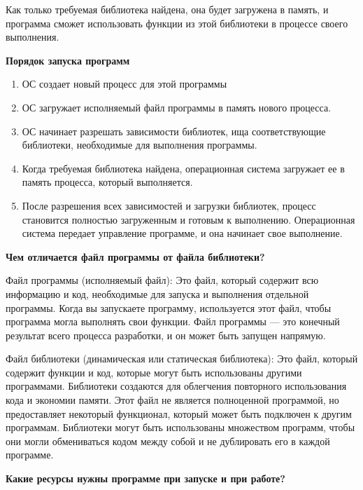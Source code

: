 \documentclass[oneside, final, 14pt]{extreport} %
\begin{document}
Как только требуемая библиотека найдена, она будет загружена в память, и программа сможет использовать функции из этой библиотеки в процессе своего выполнения.

\vspace*{\baselineskip}

\textbf{Порядок запуска программ}

\begin{enumerate}
    \item ОС создает новый процесс для этой программы
    \item ОС загружает исполняемый файл программы в память нового процесса.
    \item ОС начинает разрешать зависимости библиотек, ища соответствующие библиотеки, необходимые для выполнения программы.
    \item Когда требуемая библиотека найдена, операционная система загружает ее в память процесса, который выполняется.
    \item После разрешения всех зависимостей и загрузки библиотек, процесс становится полностью загруженным и готовым к выполнению. Операционная система передает управление программе, и она начинает свое выполнение.
\end{enumerate}


\vspace*{\baselineskip}

\textbf{Чем отличается файл программы от файла библиотеки?}

Файл программы (исполняемый файл): Это файл, который содержит всю информацию и код, необходимые для запуска и выполнения отдельной программы. Когда вы запускаете программу, используется этот файл, чтобы программа могла выполнять свои функции. Файл программы --- это конечный результат всего процесса разработки, и он может быть запущен напрямую.

Файл библиотеки (динамическая или статическая библиотека): Это файл, который содержит функции и код, которые могут быть использованы другими программами. Библиотеки создаются для облегчения повторного использования кода и экономии памяти. Этот файл не является полноценной программой, но предоставляет некоторый функционал, который может быть подключен к другим программам. Библиотеки могут быть использованы множеством программ, чтобы они могли обмениваться кодом между собой и не дублировать его в каждой программе.

\vspace*{\baselineskip}

\textbf{Какие ресурсы нужны программе при запуске и при работе?}
\end{document}
